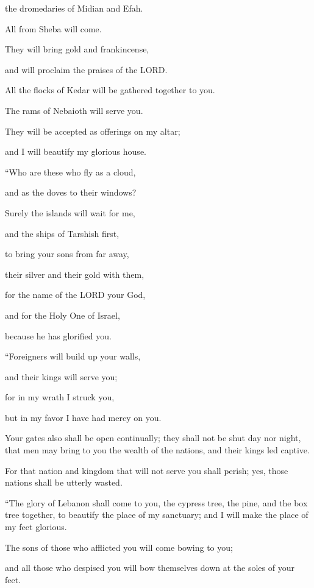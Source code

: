 the dromedaries of Midian and Efah.

All from Sheba will come.

They will bring gold and frankincense,

and will proclaim the praises of the LORD.

\myverse{}All the flocks of Kedar will be gathered together to you.

The rams of Nebaioth will serve you.

They will be accepted as offerings on my altar;

and I will beautify my glorious house.


\vspace{\baselineskip} \myverse{}“Who are these who fly as a cloud,

and as the doves to their windows?

\myverse{}Surely the islands will wait for me,

and the ships of Tarshish first,

to bring your sons from far away,

their silver and their gold with them,

for the name of the LORD your God,

and for the Holy One of Israel,

because he has glorified you.


\vspace{\baselineskip} \myverse{}“Foreigners will build up your walls,

and their kings will serve you;

for in my wrath I struck you,

but in my favor I have had mercy on you.

\myverse{}Your gates also shall be open continually; they shall not be
shut day nor night, that men may bring to you the wealth of the nations, and their kings led captive.

\myverse{}For that nation and kingdom that will not serve you shall perish;
yes, those nations shall be utterly wasted.


\vspace{\baselineskip} \myverse{}“The glory of Lebanon shall come to you, the cypress tree,
the pine, and the box tree together, to beautify the place of my sanctuary; and I will make the place
of my feet glorious.

\myverse{}The sons of those who afflicted you will come bowing to you;

and all those who despised you will bow themselves down at the soles of your feet.

